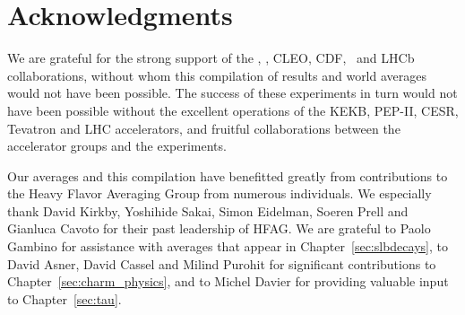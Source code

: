 \section{Acknowledgments}

We are grateful for the strong support of the \belle, 
\babar, CLEO, CDF, \dzero\ and LHCb collaborations, without whom 
this compilation of results and world averages would not have 
been possible. The success of these experiments in turn would 
not have been possible without the excellent operations of the 
KEKB, PEP-II, CESR, Tevatron and LHC accelerators, and fruitful 
collaborations between the accelerator groups and the experiments.

Our averages and this compilation have benefitted greatly from 
contributions to the Heavy Flavor Averaging Group from numerous
individuals. We especially thank David Kirkby, Yoshihide Sakai, 
Simon Eidelman, Soeren Prell and Gianluca Cavoto for their
past leadership of HFAG. 
We are grateful to Paolo Gambino for assistance with averages that appear in Chapter~\ref{sec:slbdecays},
to David Asner, David Cassel and Milind Purohit 
for significant contributions to Chapter~\ref{sec:charm_physics}, 
and to Michel Davier for providing valuable input to Chapter~\ref{sec:tau}.
